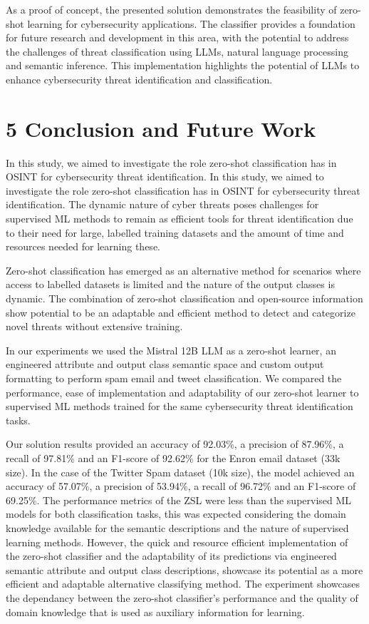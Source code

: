 \documentclass[letterpaper,twocolumn,fleqn]{article}
\begin{document}
As a proof of concept, the presented solution demonstrates the feasibility of zero-shot learning for cybersecurity applications. The classifier provides a foundation for future research and development in this area, with the potential to address the challenges of threat classification using LLMs, natural language processing and semantic inference. This implementation highlights the potential of LLMs to enhance cybersecurity threat identification and classification.

\section{5 Conclusion and Future Work}
\label{conclusion}
In this study, we aimed to investigate the role zero-shot classification has in OSINT for cybersecurity threat identification. 
In this study, we aimed to investigate the role zero-shot classification has in OSINT for cybersecurity threat identification. 
The dynamic nature of cyber threats poses challenges for supervised ML methods to remain as efficient tools for threat identification due to their need for large, labelled training datasets and the amount of time and resources needed for learning these. 

Zero-shot classification has emerged as an alternative method for scenarios where access to labelled datasets is limited and the nature of the output classes is dynamic.
The combination of zero-shot classification and open-source information show potential to be an adaptable and efficient method to detect and categorize novel threats without extensive training. 

In our experiments we used the Mistral 12B LLM as a zero-shot learner, an engineered attribute and output class semantic space and custom output formatting to perform spam email and tweet classification. 
We compared the performance, ease of implementation and adaptability of our zero-shot learner to supervised ML methods trained for the same cybersecurity threat identification tasks. 

Our solution results provided an accuracy of 92.03\%, a precision of 87.96\%, a recall of 97.81\% and an F1-score of 92.62\% for the Enron email dataset (33k size). In the case of the Twitter Spam dataset (10k size), the model achieved an accuracy of 57.07\%, a precision of 53.94\%, a recall of 96.72\% and an F1-score of 69.25\%.
The performance metrics of the ZSL were less than the supervised ML models for both classification tasks, this was expected considering the domain knowledge available for the semantic descriptions and the nature of supervised learning methods. 
However, the quick and resource efficient implementation of the zero-shot classifier and the adaptability of its predictions via engineered semantic attribute and output class descriptions, showcase its potential as a more efficient and adaptable alternative classifying method. 
The experiment showcases the dependancy between the zero-shot classifier's performance and the quality of domain knowledge that is used as auxiliary information for learning. 
\end{document}
